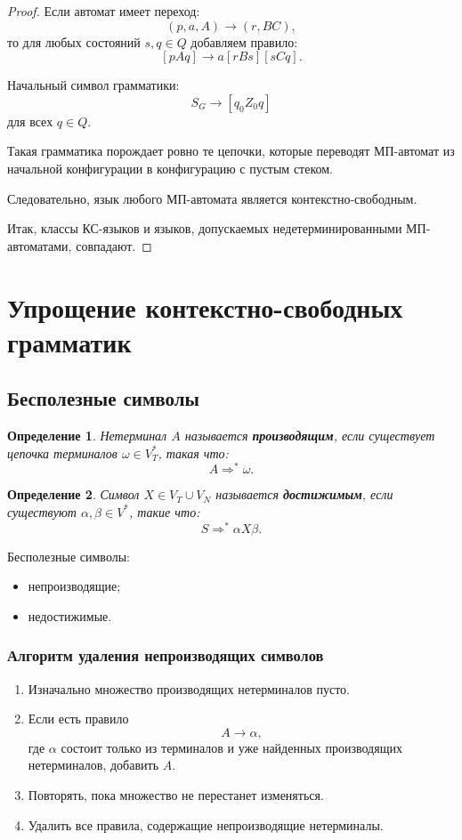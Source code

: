 \documentclass[12pt,a4paper]{article}
\newtheorem{definition}{Определение}
\newcommand{\derivesstar}{\Rightarrow^{*}}
\begin{document}
\begin{proof}
Если автомат имеет переход:
\[
(p,a,A)\to(r,BC),
\]
то для любых состояний $s,q\in Q$ добавляем правило:
\[
[pAq]\to a[rBs][sCq].
\]

Начальный символ грамматики:
\[
S_G\to [q_0 Z_0 q]
\]
для всех $q\in Q$.

Такая грамматика порождает ровно те цепочки, которые переводят МП-автомат из начальной конфигурации в конфигурацию с пустым стеком.

Следовательно, язык любого МП-автомата является контекстно-свободным.

Итак, классы КС-языков и языков, допускаемых недетерминированными МП-автоматами, совпадают.
\end{proof}

\section{Упрощение контекстно-свободных грамматик}

\subsection{Бесполезные символы}

\begin{definition}
Нетерминал $A$ называется \textbf{производящим}, если существует цепочка терминалов $\omega\in V_T^*$, такая что:
\[
A\derivesstar \omega.
\]
\end{definition}

\begin{definition}
Символ $X\in V_T\cup V_N$ называется \textbf{достижимым}, если существуют $\alpha,\beta\in V^*$, такие что:
\[
S\derivesstar \alpha X\beta.
\]
\end{definition}

Бесполезные символы:
\begin{itemize}
    \item непроизводящие;
    \item недостижимые.
\end{itemize}

\subsubsection*{Алгоритм удаления непроизводящих символов}

\begin{enumerate}
    \item Изначально множество производящих нетерминалов пусто.
    \item Если есть правило
    \[
    A\to \alpha,
    \]
    где $\alpha$ состоит только из терминалов и уже найденных производящих нетерминалов, добавить $A$.
    \item Повторять, пока множество не перестанет изменяться.
    \item Удалить все правила, содержащие непроизводящие нетерминалы.
\end{enumerate}
\end{document}
